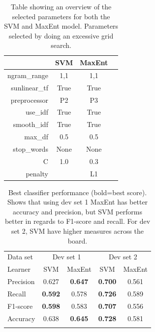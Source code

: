 \begin{table}[!htb]
\centering
\begin{tabular}{|r||c|c|c|} 
\cline{2-3}
\multicolumn{1}{c|}{ } & \textbf{SVM} & \textbf{MaxEnt} \\ \hline
ngram\_range & 1,1 & 1,1 \\ \hline
sunlinear\_tf  & True & True \\ \hline
preprocessor & P2 & P3 \\ \hline
use\_idf & True & True \\ \hline
smooth\_idf & True & True \\ \hline
max\_df & 0.5 & 0.5 \\ \hline
stop\_words & None & None \\ \hline
C & 1.0 & 0.3 \\ \hline
penalty &  & L1 \\ \hline

\end{tabular}
\caption[Selected parameters from grid search]{Table showing an overview of the selected parameters for both the SVM and MaxEnt model. Parameters selected by doing an excessive grid search.}
\label{tab:svm_maxent_best_params}
\end{table}


\begin{table}[!htb]
	\centering
	\begin{tabular}{l|cc|cc} 
	\noalign{\smallskip}\hline\noalign{\smallskip}
	Data set & \multicolumn{2}{c|}{Dev set 1} & \multicolumn{2}{c}{Dev set 2} \\
	Learner  & SVM    & MaxEnt & SVM    & MaxEnt \\
	\noalign{\smallskip}\hline\noalign{\smallskip}
	Precision  & 0.627  & {\bf 0.647}   & {\bf 0.700}  & 0.561 \\
	Recall       & {\bf 0.592}  & 0.578  & {\bf 0.726}  & 0.589 \\
	F1-score  & {\bf 0.598}  & 0.583  & {\bf 0.707}  & 0.556 \\
	Accuracy & 0.638  & {\bf 0.645}  & {\bf 0.728}  & 0.581 \\
	\noalign{\smallskip}\hline\noalign{\smallskip}
	\end{tabular}
	\caption[Best classifier performance]{Best classifier performance {\small (bold=best score)}. Shows that using dev set 1 MaxEnt has better accuracy and precision, but SVM performs better in regards to F1-score and recall. For dev set 2, SVM have higher measures across the board.}
	\label{tab:performance}
\end{table}


